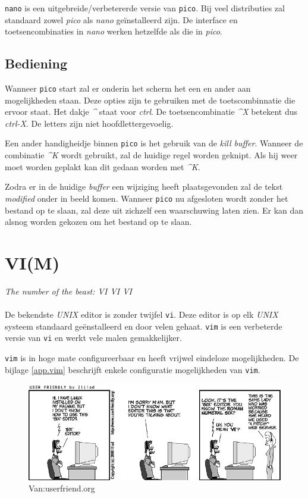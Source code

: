 \texttt{nano} is een uitgebreide/verbetererde versie van \texttt{pico}. Bij veel distributies zal standaard zowel \emph{pico} als \emph{nano} ge\"{i}nstalleerd zijn. De interface en toetsencombinaties in \emph{nano} werken hetzelfde als die in \emph{pico}.

\subsection{Bediening}
Wanneer \texttt{pico} start zal er onderin het scherm het een en ander aan mogelijkheden staan. Deze opties zijn te gebruiken met de toetscombinnatie die ervoor staat. Het dakje \emph{\^{}} staat voor \emph{ctrl}. De toetsencombinatie \emph{\^{}X} betekent dus \emph{ctrl-X}. De letters zijn niet hoofdlettergevoelig. 

Een ander handigheidje binnen \texttt{pico} is het gebruik van de \emph{kill buffer}. Wanneer de combinatie \emph{\^{}K} wordt gebruikt, zal de huidige regel worden geknipt. Als hij weer moet worden geplakt kan dit gedaan worden met \emph{\^{}K}. 

Zodra er in de huidige \emph{buffer} een wijziging heeft plaatsgevonden zal de tekst \emph{modified} onder in beeld komen. Wanneer \texttt{pico} nu afgesloten wordt zonder het bestand op te slaan, zal deze uit zichzelf een waarschuwing laten zien. Er kan dan alsnog worden gekozen om het bestand op te slaan. 

\section{VI(M)}
\emph{The number of the beast: VI VI VI}\\\\
De bekendste \emph{UNIX} editor is zonder twijfel \texttt{vi}. Deze editor is op elk \emph{UNIX} systeem standaard ge\"{e}nstalleerd en door velen gehaat. \texttt{vim} is een verbeterde versie van \texttt{vi} en werkt vele malen gemakkelijker.

\texttt{vim} is in hoge mate configureerbaar en heeft vrijwel eindeloze mogelijkheden. De bijlage \ref{app.vim} beschrijft enkele configuratie mogelijkheden van \texttt{vim}. 
\begin{figure}[H]
  \begin{center}
    \includegraphics[scale=0.5]{images/uf001688}
  \end{center}
  \caption{Van:userfriend.org}
  \label{fig:setup}
\end{figure}

